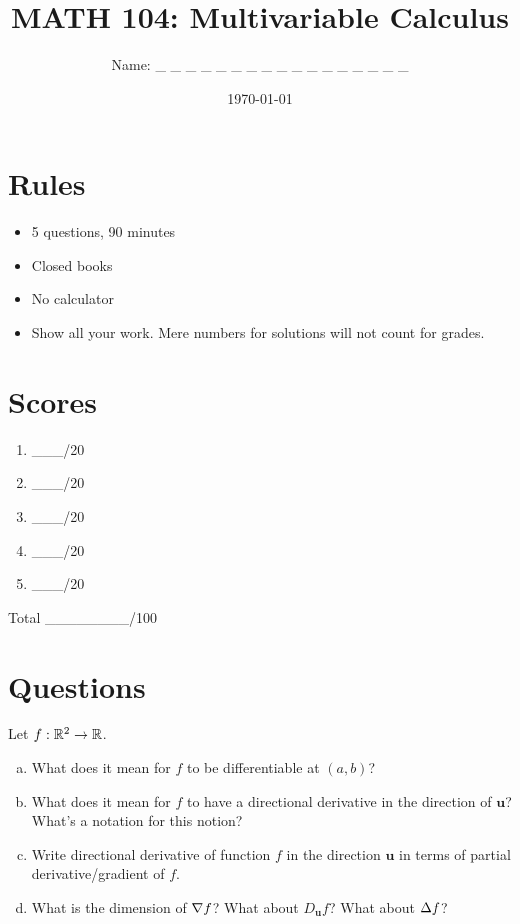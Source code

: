 \documentclass[12pt]{article}
\title{ MATH 104: Multivariable Calculus}
\author{Name: \_ \_ \_ \_ \_ \_ \_ \_ \_ \_ \_ \_ \_ \_ \_ \_ \_}
\date{\today}
\begin{document}
\maketitle

\section*{Rules}

\begin{itemize}
    \item 5 questions, 90 minutes
    \item Closed books
    \item No calculator
    \item Show all your work. Mere numbers for solutions will not count for grades.
\end{itemize}

\section*{Scores}

\begin{enumerate}[Problem 1.]
    \item  \_\_\_/20
    \item  \_\_\_/20
    \item \_\_\_/20
    \item  \_\_\_/20
    \item  \_\_\_/20
\end{enumerate}
Total \_\_\_\_\_\_\_\_/100


\newpage
\section*{Questions}

\begin{problem}Let $f:\mathbb{R}^2 \to \mathbb{R}$.
    \begin{enumerate}[a.]
        \item  What does it mean for $f$ to be 
            differentiable at $(a,b)$?
        \item What does it mean for $f$ to have a directional derivative
            in the direction of $\textbf{u}$? What's a notation for this notion?
        \item Write directional derivative of function $f$ in the direction $\textbf{u}$ in terms of partial derivative/gradient of $f$.
        \item What is the dimension of $\nabla f$? 
            What about $D_{\textbf{u}}f$? 
            What about $\Delta f$?
    \end{enumerate}
\end{problem}
\end{document}
